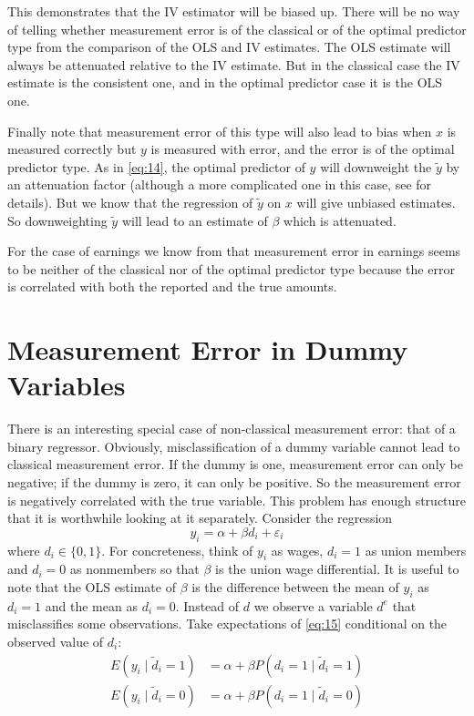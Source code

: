 \documentclass[12pt]{article}
\begin{document}
This demonstrates that the IV estimator will be biased up. There will be no way of telling whether measurement error is of the classical or of the optimal predictor type from the comparison of the OLS and IV estimates. The OLS estimate will always be attenuated relative to the IV estimate. But in the classical case the IV estimate is the consistent one, and in the optimal predictor case it is the OLS one.

Finally note that measurement error of this type will also lead to bias when $x$ is measured correctly but $y$ is measured with error, and the error is of the optimal predictor type. As in \eqref{eq:14}, the optimal predictor of $y$ will downweight the $\tilde{y}$ by an attenuation factor (although a more complicated one in this case, see \cite{Hyslop_Imbens_2001} for details). But we know that the regression of $\tilde{y}$ on $x$ will give unbiased estimates. So downweighting $\tilde{y}$ will lead to an estimate of $\beta$ which is attenuated.

For the case of earnings we know from \cite{Bound_etal_1994} that measurement error in earnings seems to be neither of the classical nor of the optimal predictor type because the error is correlated with both the reported and the true amounts.

\section*{Measurement Error in Dummy Variables}
There is an interesting special case of non-classical measurement error: that of a binary regressor. Obviously, misclassification of a dummy variable cannot lead to classical measurement error. If the dummy is one, measurement error can only be negative; if the dummy is zero, it can only be positive. So the measurement error is negatively correlated with the true variable. This problem has enough structure that it is worthwhile looking at it separately. Consider the regression
\begin{equation}
\label{eq:15}
y_i = \alpha + \beta d_i + \varepsilon_i
\end{equation}
where $d_i \in \{0, 1\}$. For concreteness, think of $y_i$ as wages, $d_i = 1$ as union members and $d_i = 0$ as nonmembers so that $\beta$ is the union wage differential. It is useful to note that the OLS estimate of $\beta$ is the difference between the mean of $y_i$ as $d_i = 1$ and the mean as $d_i = 0$. Instead of $d$ we observe a variable $d^{e}$ that misclassifies some observations. Take expectations of \eqref{eq:15} conditional on the observed value of $d_i$:
\begin{align*}
E(y_i \mid \tilde{d}_i = 1) &= \alpha + \beta P(d_i = 1 \mid \tilde{d}_i = 1)\\
E(y_i \mid \tilde{d}_i = 0) &= \alpha + \beta P(d_i = 1 \mid \tilde{d}_i = 0)
\end{align*}
\end{document}
